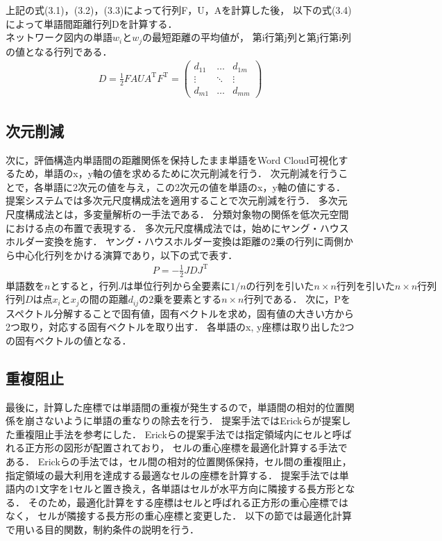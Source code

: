 \documentclass[syuuron]{kuee}
\begin{document}
				
				
			上記の式(3.1)，(3.2)，(3.3)によって行列F，U，Aを計算した後，
			以下の式(3.4)によって単語間距離行列Dを計算する．
			$ネットワーク図内の単語w_iとw_jの最短距離の平均値が，$
			第i行第j列と第j行第i列の値となる行列である．
			\begin{eqnarray}
			 D = \frac{1}{2} FAUA^{\mathrm{T}}F^{\mathrm{T}}
			   = \left(
			    \begin{array}{cccc}
			    	d_{11} & \ldots & d_{1m} \\
			    	\vdots & \ddots & \vdots \\
			    	d_{m1} & \ldots & d_{mm}
				\end{array}
			 \right)
			\end{eqnarray}	
			
		\subsection{次元削減}
			次に，評価構造内単語間の距離関係を保持したまま単語をWord Cloud可視化するため，単語のx，y軸の値を求めるために次元削減を行う．
			次元削減を行うことで，各単語に2次元の値を与え，この2次元の値を単語のx，y軸の値にする．
			提案システムでは多次元尺度構成法を適用することで次元削減を行う．
			多次元尺度構成法とは，多変量解析の一手法である． 分類対象物の関係を低次元空間における点の布置で表現する．
			多次元尺度構成法では，始めにヤング・ハウスホルダー変換を施す．
			ヤング・ハウスホルダー変換は距離の2乗の行列に両側から中心化行列をかける演算であり，以下の式で表す．
			\begin{eqnarray}
				P = - \frac{1}{2} JDJ^{\mathrm{T}}
			\end{eqnarray}
			$単語数をnとすると，行列Jは単位行列から全要素に1/nの行列を引いたn \times n行列を引いたn \times n行列$
			$行列Dは点 x_i と x_j の間の距離 d_{ij} の2乗を要素とするn \times n行列である．$
			次に，Pをスペクトル分解することで固有値，固有ベクトルを求め，固有値の大きい方から2つ取り，対応する固有ベクトルを取り出す．
			各単語のx, y座標は取り出した2つの固有ベクトルの値となる．
			
		\subsection{重複阻止}
			最後に，計算した座標では単語間の重複が発生するので，単語間の相対的位置関係を崩さないように単語の重なりの除去を行う．
			提案手法ではErickらが提案した重複阻止手法を参考にした\cite{or2}．
			Erickらの提案手法では指定領域内にセルと呼ばれる正方形の図形が配置されており，
			セルの重心座標を最適化計算する手法である．
			Erickらの手法では，セル間の相対的位置関係保持，セル間の重複阻止，指定領域の最大利用を達成する最適なセルの座標を計算する．
			提案手法では単語内の1文字を1セルと置き換え，各単語はセルが水平方向に隣接する長方形となる．
			そのため，最適化計算をする座標はセルと呼ばれる正方形の重心座標ではなく，
			セルが隣接する長方形の重心座標と変更した．
			以下の節では最適化計算で用いる目的関数，制約条件の説明を行う．
			
\end{document}
